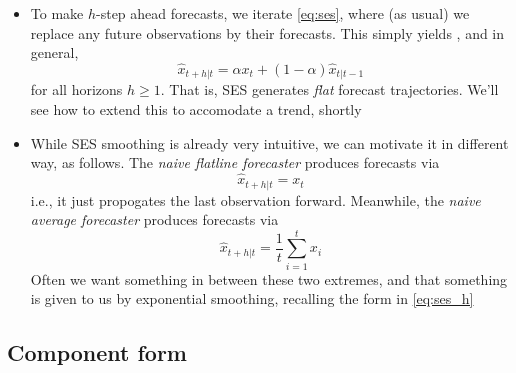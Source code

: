 \documentclass{article}
\begin{document}
\begin{itemize}
\item To make $h$-step ahead forecasts, we iterate \eqref{eq:ses}, where (as 
  usual) we replace any future observations by their forecasts. This simply   
  yields , and in general, 
  \begin{equation}
  \label{eq:ses_h}
  \hat{x}_{t+h | t} = \alpha x_t + (1-\alpha) \hat{x}_{t | t-1}
  \end{equation}
  for all horizons $h \geq 1$. That is, SES generates \emph{flat} forecast
  trajectories. We'll see how to extend this to accomodate a trend, shortly  

\item While SES smoothing is already very intuitive, we can motivate it in
  different way, as follows. The \emph{naive flatline forecaster} produces
  forecasts via
  \begin{equation}
  \label{eq:flatline_h}
  \hat{x}_{t+h | t} = x_t 
  \end{equation}
  i.e., it just propogates the last observation forward. Meanwhile, the
  \emph{naive average forecaster} produces forecasts via
  \begin{equation}
  \label{eq:average_h}
  \hat{x}_{t+h | t} = \frac{1}{t} \sum_{i=1}^t x_i
  \end{equation}
  Often we want something in between these two extremes, and that something is  
  given to us by exponential smoothing, recalling the form in \eqref{eq:ses_h} 
\end{itemize}

\subsection{Component form}
\end{document}
